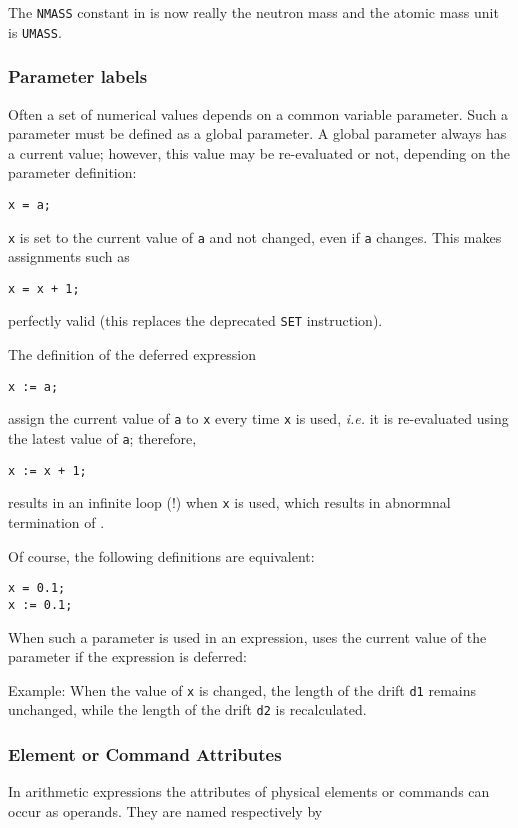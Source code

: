 The \texttt{NMASS} constant in \madx is now really the neutron mass and the atomic mass
unit is \texttt{UMASS}.

\subsubsection{Parameter labels} 
Often a set of numerical values depends on a common variable
parameter. Such a parameter must be defined as a global parameter. A
global parameter always has a current value; however, this value may be
re-evaluated or not, depending on the parameter definition:  
\begin{verbatim}
x = a;
\end{verbatim} 
\texttt{x} is set to the current value of \texttt{a} and not changed,
even if \texttt{a} changes. This makes assignments such as  
\begin{verbatim}
x = x + 1;
\end{verbatim} 
perfectly valid (this replaces the deprecated \texttt{SET} instruction).

The definition of the deferred expression  
\begin{verbatim}
x := a;
\end{verbatim} 
assign the current value of \texttt{a} to \texttt{x} every time
\texttt{x} is used, \textsl{i.e.} it is re-evaluated using the latest
value of \texttt{a}; therefore,   
\begin{verbatim}
x := x + 1;
\end{verbatim} 
results in an infinite loop (!) when \texttt{x} is used, which results
in abnormnal termination of \madx. 

Of course, the following definitions are equivalent:  
\begin{verbatim}
x = 0.1;
x := 0.1;
\end{verbatim}

When such a parameter is used in an expression, \madx uses the current
value of the parameter if the expression is deferred:  

Example: 
When the value of \texttt{x} is changed, the length of the drift
\texttt{d1} remains unchanged, while the length of the drift \texttt{d2}
is recalculated.

\subsubsection{Element or Command Attributes} 
In arithmetic expressions the attributes of physical elements or
commands can occur as operands. They are named respectively by  


